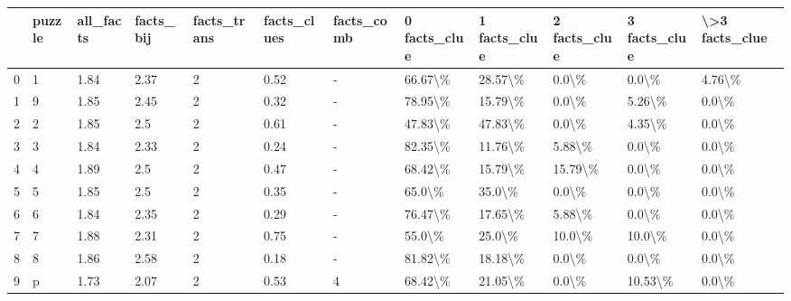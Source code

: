 \begin{tabular}{llllllllllll}
\toprule
{} & puzzle & all\_facts & facts\_bij & facts\_trans & facts\_clues & facts\_comb & 0 facts\_clue & 1 facts\_clue & 2 facts\_clue & 3 facts\_clue & \textbackslash >3 facts\_clue \\
\midrule
0 &      1 &      1.84 &      2.37 &           2 &        0.52 &          - &      66.67\textbackslash \% &      28.57\textbackslash \% &        0.0\textbackslash \% &        0.0\textbackslash \% &         4.76\textbackslash \% \\
1 &      9 &      1.85 &      2.45 &           2 &        0.32 &          - &      78.95\textbackslash \% &      15.79\textbackslash \% &        0.0\textbackslash \% &       5.26\textbackslash \% &          0.0\textbackslash \% \\
2 &      2 &      1.85 &       2.5 &           2 &        0.61 &          - &      47.83\textbackslash \% &      47.83\textbackslash \% &        0.0\textbackslash \% &       4.35\textbackslash \% &          0.0\textbackslash \% \\
3 &      3 &      1.84 &      2.33 &           2 &        0.24 &          - &      82.35\textbackslash \% &      11.76\textbackslash \% &       5.88\textbackslash \% &        0.0\textbackslash \% &          0.0\textbackslash \% \\
4 &      4 &      1.89 &       2.5 &           2 &        0.47 &          - &      68.42\textbackslash \% &      15.79\textbackslash \% &      15.79\textbackslash \% &        0.0\textbackslash \% &          0.0\textbackslash \% \\
5 &      5 &      1.85 &       2.5 &           2 &        0.35 &          - &       65.0\textbackslash \% &       35.0\textbackslash \% &        0.0\textbackslash \% &        0.0\textbackslash \% &          0.0\textbackslash \% \\
6 &      6 &      1.84 &      2.35 &           2 &        0.29 &          - &      76.47\textbackslash \% &      17.65\textbackslash \% &       5.88\textbackslash \% &        0.0\textbackslash \% &          0.0\textbackslash \% \\
7 &      7 &      1.88 &      2.31 &           2 &        0.75 &          - &       55.0\textbackslash \% &       25.0\textbackslash \% &       10.0\textbackslash \% &       10.0\textbackslash \% &          0.0\textbackslash \% \\
8 &      8 &      1.86 &      2.58 &           2 &        0.18 &          - &      81.82\textbackslash \% &      18.18\textbackslash \% &        0.0\textbackslash \% &        0.0\textbackslash \% &          0.0\textbackslash \% \\
9 &      p &      1.73 &      2.07 &           2 &        0.53 &          4 &      68.42\textbackslash \% &      21.05\textbackslash \% &        0.0\textbackslash \% &      10.53\textbackslash \% &          0.0\textbackslash \% \\
\bottomrule
\end{tabular}
